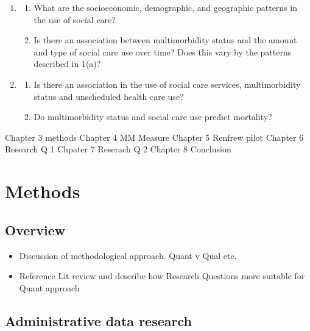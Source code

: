 \documentclass[12pt,]{report}
\providecommand{\tightlist}{%
  \setlength{\itemsep}{0pt}\setlength{\parskip}{0pt}}
\begin{document}
\begin{enumerate}
\def\labelenumi{\arabic{enumi}.}
\item
  \begin{enumerate}
  \def\labelenumii{\alph{enumii}.}
  \tightlist
  \item
    What are the socioeconomic, demographic, and geographic patterns in
    the use of social care?
  \item
    Is there an association between multimorbidity status and the amount
    and type of social care use over time? Does this vary by the
    patterns described in 1(a)?
  \end{enumerate}
\item
  \begin{enumerate}
  \def\labelenumii{\alph{enumii}.}
  \tightlist
  \item
    Is there an association in the use of social care services,
    multimorbidity status and unscheduled health care use?
  \item
    Do multimorbidity status and social care use predict mortality?
  \end{enumerate}
\end{enumerate}

Chapter 3 methods Chapter 4 MM Measure Chapter 5 Renfrew pilot Chapter 6
Research Q 1 Chpater 7 Reserach Q 2 Chapter 8 Conclusion

\FloatBarrier
\newpage
{}

\chapter{Methods}\label{ch:methods}

\section{Overview}\label{sec:methods-overview}

\begin{itemize}
\tightlist
\item
  Discussion of methodological approach. Quant v Qual etc.
\item
  Reference Lit review and describe how Research Questions more suitable
  for Quant approach
\end{itemize}

\section{Administrative data research}\label{sec:methods-admindata}
\end{document}
